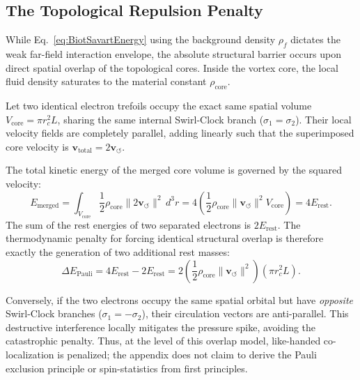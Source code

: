 \documentclass[11pt,a4paper]{article}
\newcommand{\rc}{r_c}
\newcommand{\rhocore}{\rho_{\text{core}}}
\begin{document}
    \subsection{The Topological Repulsion Penalty}
        While Eq.~\eqref{eq:BiotSavartEnergy} using the background density $\rho_{\!f}$ dictates the weak far-field interaction envelope, the absolute structural barrier occurs upon direct spatial overlap of the topological cores. Inside the vortex core, the local fluid density saturates to the material constant $\rhocore$.
        
        Let two identical electron trefoils occupy the exact same spatial volume $V_{\text{core}} = \pi \rc^2 L$, sharing the same internal Swirl-Clock branch ($\sigma_1 = \sigma_2$). Their local velocity fields are completely parallel, adding linearly such that the superimposed core velocity is $\mathbf{v}_{\text{total}} = 2\mathbf{v}_{\!\boldsymbol{\circlearrowleft}}$.
        
        The total kinetic energy of the merged core volume is governed by the squared velocity:
        \begin{equation}
            E_{\text{merged}} = \int_{V_{\text{core}}} \frac{1}{2} \rhocore \lVert 2\mathbf{v}_{\!\boldsymbol{\circlearrowleft}} \rVert^2 \, d^3r = 4 \left( \frac{1}{2} \rhocore \lVert \mathbf{v}_{\!\boldsymbol{\circlearrowleft}} \rVert^2 V_{\text{core}} \right) = 4 E_{\text{rest}}.
        \end{equation}
        The sum of the rest energies of two separated electrons is $2 E_{\text{rest}}$. The thermodynamic penalty for forcing identical structural overlap is therefore exactly the generation of two additional rest masses:
        \begin{equation}
            \label{eq:VPauli_Max}
            \Delta E_{\text{Pauli}} = 4 E_{\text{rest}} - 2 E_{\text{rest}} = 2 \left( \frac{1}{2} \rhocore \lVert \mathbf{v}_{\!\boldsymbol{\circlearrowleft}} \rVert^2 \right) (\pi \rc^2 L).
        \end{equation}
        
        Conversely, if the two electrons occupy the same spatial orbital but have \emph{opposite} Swirl-Clock branches ($\sigma_1 = -\sigma_2$), their circulation vectors are anti-parallel. This destructive interference locally mitigates the pressure spike, avoiding the catastrophic penalty. Thus, at the level of this overlap model, like-handed co-localization is penalized; the appendix does not claim to derive the Pauli exclusion principle or spin-statistics from first principles.
    
\end{document}
